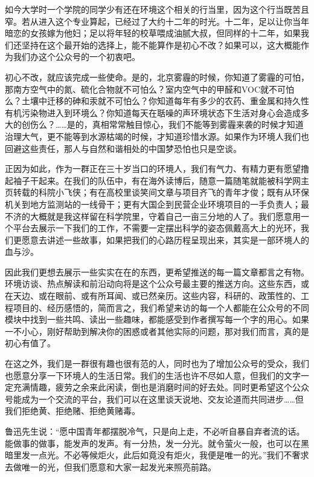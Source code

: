 \documentclass[
]{book}
\begin{document}
如今大学时一个学院的同学少有还在环境这个相关的行当里，因为这个行当既苦且窄。若从进入这个专业算起，已经过了大约十二年的时光。十二年，足以让你当年暗恋的女孩嫁为他妇；足以将年轻的校草喂成油腻大叔，但同样的十二年，如果我们还坚持在这个最开始的选择上，能不能算作是初心不改？如果可以，这大概能作为我们办这个公众号的一个初衷吧。

初心不改，就应该完成一些使命。是的，北京雾霾的时候，你知道了雾霾的可怕，那南方空气中的氮、硫化合物就不可怕么？室内空气中的甲醛和VOC就不可怕么？土壤中迁移的砷和汞就不可怕么？你知道每年有多少的农药、重金属和持久性有机污染物进入到环境么？你知道每天在聒噪的声环境状态下生活对身心会造成多大的创伤么？\ldots\ldots 是的，真相常常触目惊心，我们不能等到雾霾来袭的时候才知道治理大气，更不能等到水源枯竭的时候，才知道珍惜水源。如果作为环境人我们也回避这些责任，那人与自然和谐相处的中国梦恐怕也只是空谈。

正因为如此，作为一群正在三十岁当口的环境人，我们有气力、有精力更有愿望撸起袖子干起来。在我们的队伍中，有在海外读博后，随意一篇随笔就能被科学网主页转载的科院小飞侠；有在高校里谈笑间文章与项目齐飞的青年才俊；既有从环保机关到地方监测站的一线骨干；更有大国企到民营企业环境项目的一手负责人；最不济的大概就是我这样留在科学院里，守着自己一亩三分地的人了。我们愿意用一个平台去展示一下我们的工作，不需要一定摆出科学的姿态佩戴高大上的光环，我们更愿意去讲述一些故事，如果把我们的心路历程呈现出来，其实是一部环境人的血与沙。

因此我们更想去展示一些实实在在的东西，更希望推送的每一篇文章都言之有物。环境访谈、热点解读和前沿动向将是这个公众号最主要的推送方向。这些东西，或在天边、或在眼前、或有所耳闻、或已然亲历。这些内容，科研的、政策性的、工程项目的、经历感悟的，简而言之，我们希望来访的每一个人都能在公众号的不同模块中找到一些共鸣、读出一些趣味，都能感受到作者撰写每一个字的用心。如果一不小心，刚好帮助到解决你的困惑或者其他实际的问题，那对我们而言，真的是初心有值了。

在这之外，我们是一群很有趣也很有范的人，同时也为了增加公众号的受众，我们也愿意分享一下环境人的生活日常。我们的生活也许不尽如人意，但我们的文字一定充满情趣，疲劳之余来此闲读，倒也是消磨时间的好去处。同时更希望这个公众号能成为一个交流的平台，我们可以在这里谈天说地、交友论道而共同进步\ldots\ldots 但我们拒绝黄、拒绝赌、拒绝黄赌毒。

鲁迅先生说：``愿中国青年都摆脱冷气，只是向上走，不必听自暴自弃者流的话。能做事的做事，能发声的发声。有一分热，发一分光。就令萤火一般，也可以在黑暗里发一点光。不必等候炬火，此后如竟没有炬火，我便是唯一的光。''我们不奢求去做唯一的光，但我们愿意和大家一起发光来照亮前路。
\end{document}

